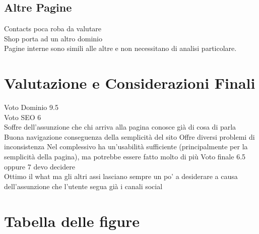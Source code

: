 \documentclass[10pt,a4paper]{article}
\begin{document}
\subsection{Altre Pagine}
Contacts poca roba da valutare \\
Shop porta ad un altro dominio \\
Pagine interne sono simili alle altre e non necessitano di analisi particolare.
\section{Valutazione e Considerazioni Finali}
Voto Dominio 9.5 \\
Voto SEO 6 \\
Soffre dell'assunzione che chi arriva alla pagina conosce già di cosa di parla
Buona navigazione conseguenza della semplicità del sito
Offre diversi problemi di inconsistenza
Nel complessivo ha un'usabilità sufficiente (principalmente per la semplicità della pagina), ma potrebbe essere fatto molto di più
Voto finale 6.5 oppure 7 devo decidere \\
Ottimo il what ma gli altri assi lasciano sempre un po' a desiderare a causa dell'assunzione che l'utente segua già i canali social
\appendix
\section{Tabella delle figure}
\end{document}
